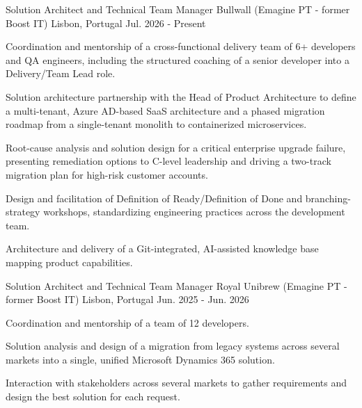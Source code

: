 

\begin{cventries}

  \cventry
    {Solution Architect and Technical Team Manager} %
    {Bullwall (Emagine PT - former Boost IT)} %
    {Lisbon, Portugal} %
    {Jul. 2026 - Present} %
    {
      \begin{cvitems} %
        \item {Coordination and mentorship of a cross-functional delivery team of 6+ developers and QA engineers, including the structured coaching of a senior developer into a Delivery/Team Lead role.}
        \item {Solution architecture partnership with the Head of Product Architecture to define a multi-tenant, Azure AD-based SaaS architecture and a phased migration roadmap from a single-tenant monolith to containerized microservices.}
        \item {Root-cause analysis and solution design for a critical enterprise upgrade failure, presenting remediation options to C-level leadership and driving a two-track migration plan for high-risk customer accounts.}
        \item {Design and facilitation of Definition of Ready/Definition of Done and branching-strategy workshops, standardizing engineering practices across the development team.}
        \item {Architecture and delivery of a Git-integrated, AI-assisted knowledge base mapping product capabilities.}
      \end{cvitems}
    }

  \cventry
    {Solution Architect and Technical Team Manager} %
    {Royal Unibrew (Emagine PT - former Boost IT)} %
    {Lisbon, Portugal} %
    {Jun. 2025 - Jun. 2026} %
    {
      \begin{cvitems} %
        \item {Coordination and mentorship of a team of 12 developers.}
        \item {Solution analysis and design of a migration from legacy systems across several markets into a single, unified Microsoft Dynamics 365 solution.}
        \item {Interaction with stakeholders across several markets to gather requirements and design the best solution for each request.}
      \end{cvitems}
    }


\end{cventries}
